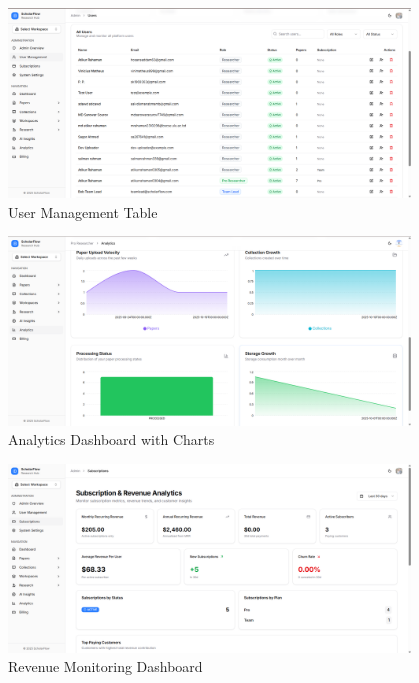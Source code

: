 \begin{figure}[H]
\centering
\includegraphics[width=0.95\textwidth]{images/screenshots/user_management.png}
\caption{User Management Table}
\label{fig:screenshot-user-management}
\end{figure}

\begin{figure}[H]
\centering
\includegraphics[width=0.95\textwidth]{images/screenshots/analytics.png}
\caption{Analytics Dashboard with Charts}
\label{fig:screenshot-analytics}
\end{figure}

\begin{figure}[H]
\centering
\includegraphics[width=0.95\textwidth]{images/screenshots/admin_revenue_monitor.png}
\caption{Revenue Monitoring Dashboard}
\label{fig:screenshot-revenue}
\end{figure}

